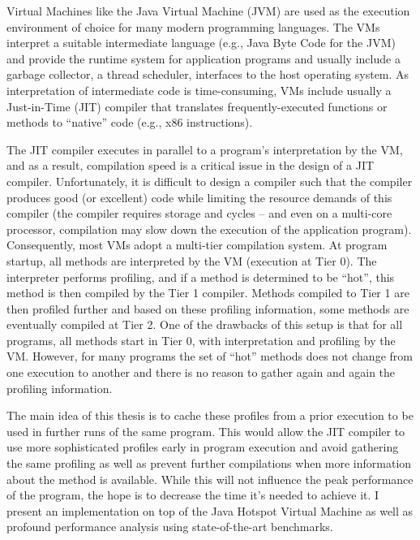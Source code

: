 Virtual Machines like the Java Virtual Machine (JVM) are used as the execution environment of choice for many modern programming languages. 
The VMs interpret a suitable intermediate language (e.g., Java Byte Code for the JVM) and provide the runtime system for application programs and usually include a garbage collector, a thread scheduler, interfaces to the host operating system. 
As interpretation of intermediate code is time-consuming, VMs include usually a Just-in-Time (JIT) compiler that translates frequently-executed functions or methods to “native” code (e.g., x86 instructions).

The JIT compiler executes in parallel to a program’s interpretation by the VM, and as a result, compilation speed is a critical issue in the design of a JIT compiler.
Unfortunately, it is difficult to design a compiler such that the compiler produces good (or excellent) code while limiting the resource demands of this compiler (the compiler requires storage and cycles – and even on a multi-core processor, compilation may slow down the execution of the application program). 
Consequently, most VMs adopt a multi-tier compilation system.
At program startup, all methods are interpreted by the VM (execution at Tier 0). The interpreter performs profiling, and if a method is determined to be “hot”, this method is then compiled by the Tier 1 compiler. Methods compiled to Tier 1 are then profiled further and based on these profiling information, some methods are eventually compiled at Tier 2.
One of the drawbacks of this setup is that for all programs, all methods start in Tier 0, with interpretation and profiling by the VM. However, for many programs the set of “hot” methods does not change from one execution to another and there is no reason to gather again and again the profiling information. 

The main idea of this thesis is to cache these profiles from a prior execution to be used in further runs of the same program. 
This would allow the JIT compiler to use more sophisticated profiles early in program execution and avoid gathering the same profiling as well as prevent further compilations when more information about the method is available. While this will not influence the peak performance of the program, the hope is to decrease the time it's needed to achieve it.
I present an implementation on top of the Java Hotspot Virtual Machine as well as profound performance analysis using state-of-the-art benchmarks.
